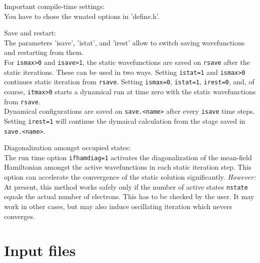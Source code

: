 \documentclass[12pt]{article}
\begin{document}
\begin{description}

 \item{Important compile-time settings:}\\
  You have to chose the wnated options in 'define.h'.

 \item{Save and restart:}\\
  The parameters 'isave', 'istat', and 'irest' allow to switch
  saving wavefunctions and restarting from them.\\
  For {\tt ismax>0} and  {\tt isave>1}, 
  the static wavefunctions are saved on {\tt rsave}
  after the static iterations. These can be used in two ways.
  Setting  {\tt istat=1} and  {\tt ismax>0} continues static
  iteration from  {\tt rsave}. Setting  {\tt ismax=0},  {\tt istat=1},
  {\tt irest=0}, and, of course,  {\tt itmax>0} starts a dynamical
  run at time zero with the static wavefunctions from  {\tt rsave}.
  \\
  Dynamical configurations are saved on  {\tt save.<name>} after every
  {\tt isave} time steps. Setting  {\tt irest=1} will
  continue the dymaical calculation 
  from the stage saved in  {\tt save.<name>}.

 \item{Diagonalization amongst occupied states:}\\
  The run time option {\tt ifhamdiag=1}
  activates the diagonalization of the mean-field Hamiltonian
  amongst the active wavefunctions in each static iteration
  step. This option can accelerate the convergence of the static
  solution significantly. {\it However:} At present, this method works 
  safely only if the number of active states {\tt nstate}
  equals the actual number of electrons. This has to be checked 
  by the user. It may work in other cases, but may also induce
  oscillating iteration  which nevers converges.
  

\end{description}

\newpage
\section{Input files}
\label{sec:inputs}
\end{document}
